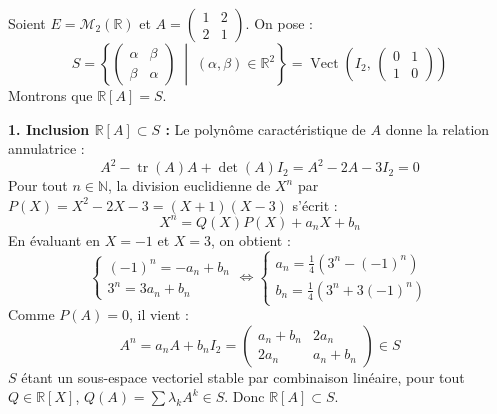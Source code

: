 \documentclass[11pt,a4paper]{report}
\begin{document}
\begin{example}
    Soient $E = \mathcal{M}_2(\mathbb{R})$ et $A = \begin{pmatrix} 1 & 2 \\ 2 & 1 \end{pmatrix}$. On pose :
    \[
        S = \left\{ \begin{pmatrix} \alpha & \beta \\ \beta & \alpha \end{pmatrix} \;\middle|\; (\alpha, \beta) \in \mathbb{R}^2 \right\} = \operatorname{Vect}\left(I_2, \, \begin{pmatrix} 0 & 1 \\ 1 & 0 \end{pmatrix}\right)
    \]
    Montrons que $\mathbb{R}[A] = S$.

    \medskip
    \textbf{1. Inclusion $\mathbb{R}[A] \subset S$ :}
    Le polynôme caractéristique de $A$ donne la relation annulatrice :
    \[
        A^2 - \operatorname{tr}(A)A + \det(A)I_2 = A^2 - 2A - 3I_2 = 0
    \]
    Pour tout $n \in \mathbb{N}$, la division euclidienne de $X^n$ par $P(X) = X^2 - 2X - 3 = (X+1)(X-3)$ s'écrit :
    \[
        X^n = Q(X)P(X) + a_n X + b_n
    \]
    En évaluant en $X = -1$ et $X = 3$, on obtient :
    \[
        \begin{cases}
            (-1)^n = -a_n + b_n \\
            3^n = 3a_n + b_n
        \end{cases}
        \iff
        \begin{cases}
            a_n = \frac{1}{4}\left(3^n - (-1)^n\right) \\
            b_n = \frac{1}{4}\left(3^n + 3(-1)^n\right)
        \end{cases}
    \]
    Comme $P(A) = 0$, il vient :
    \[
        A^n = a_n A + b_n I_2 = \begin{pmatrix} a_n + b_n & 2a_n \\ 2a_n & a_n + b_n \end{pmatrix} \in S
    \]
    $S$ étant un sous-espace vectoriel stable par combinaison linéaire, pour tout $Q \in \mathbb{R}[X]$, $Q(A) = \sum \lambda_k A^k \in S$. Donc $\mathbb{R}[A] \subset S$.


\end{example}
\end{document}
